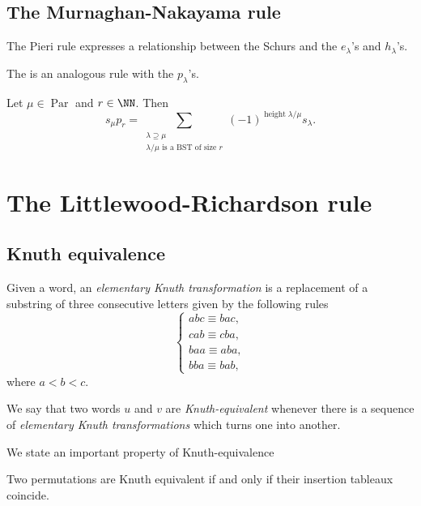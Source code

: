 \documentclass{article}
\DeclareMathOperator{\opheight}{height}
\DeclareMathOperator{\Par}{Par}
\begin{document}
\subsection{The Murnaghan-Nakayama rule}

The Pieri rule expresses a relationship between the Schurs and the $e_\lambda$'s and $h_\lambda$'s.

The  is an analogous rule with the $p_\lambda$'s.


\begin{theorem} 
    Let $\mu \in \Par$ and $r \in \NN$.
    Then
    \[
        s_\mu p_r = \sum_{\substack{\lambda\supseteq\mu \\ \lambda / \mu \text{ is a BST of size }r}}(-1)^{\opheight \lambda / \mu} s_\lambda.
    \]
\end{theorem}

\section{The Littlewood-Richardson rule}

\subsection{Knuth equivalence}

\begin{definition}
    Given a word, an \textit{elementary Knuth transformation} is a replacement of a substring of three consecutive letters given by the following rules
    \[
        \begin{cases}
            abc \equiv bac, \\
            cab \equiv cba, \\
            baa \equiv aba, \\
            bba \equiv bab,
        \end{cases}
    \]
    where $a < b < c$.
\end{definition}

\begin{definition}
    We say that two words $u$ and $v$ are \textit{Knuth-equivalent} whenever there is a sequence of \textit{elementary Knuth transformations} which turns one into another.
\end{definition}

We state an important property of Knuth-equivalence

\begin{theorem}
    Two permutations are Knuth equivalent if and only if their insertion tableaux coincide.
\end{theorem}
\end{document}
